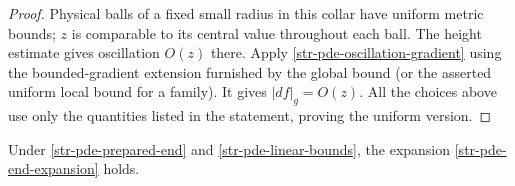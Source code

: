 \begin{proof}
Physical balls of a fixed small radius in this collar have
uniform metric bounds; $z$ is comparable to its central value
throughout each ball. The height estimate gives oscillation
$O(z)$ there. Apply \eqref{str-pde-oscillation-gradient} using
the bounded-gradient extension furnished by the global bound
(or the asserted uniform local bound for a family). It gives
$|df|_g=O(z)$. All the choices above use only the quantities
listed in the statement, proving the uniform version.
\end{proof}

\begin{lemma}
\label{str-pde-boundary-jet}
Under \eqref{str-pde-prepared-end} and
\eqref{str-pde-linear-bounds}, the expansion
\eqref{str-pde-end-expansion} holds.
\end{lemma}
